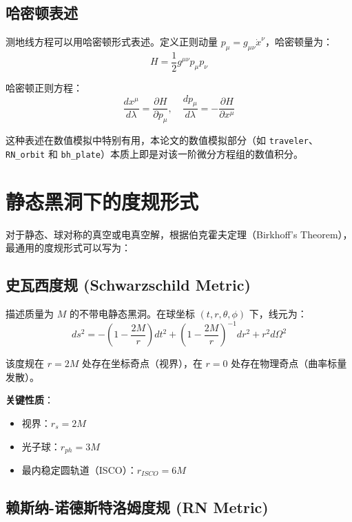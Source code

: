 \documentclass[a4paper,12pt]{article}
\begin{document}
\subsection{哈密顿表述}

测地线方程可以用哈密顿形式表述。定义正则动量 $p_\mu = g_{\mu\nu}\dot{x}^\nu$，哈密顿量为：
\begin{equation}
    H = \frac{1}{2}g^{\mu\nu}p_\mu p_\nu
\end{equation}

哈密顿正则方程：
\begin{equation}
    \frac{dx^\mu}{d\lambda} = \frac{\partial H}{\partial p_\mu}, \quad \frac{dp_\mu}{d\lambda} = -\frac{\partial H}{\partial x^\mu}
\end{equation}

这种表述在数值模拟中特别有用，本论文的数值模拟部分（如 \texttt{traveler}、\texttt{RN\_orbit} 和 \texttt{bh\_plate}）本质上即是对该一阶微分方程组的数值积分。

\section{静态黑洞下的度规形式}

对于静态、球对称的真空或电真空解，根据伯克霍夫定理（Birkhoff's Theorem），最通用的度规形式可以写为：

\subsection{史瓦西度规 (Schwarzschild Metric)}

描述质量为 $M$ 的不带电静态黑洞。在球坐标 $(t, r, \theta, \phi)$ 下，线元为：
\begin{equation}
    ds^2 = -\left(1-\frac{2M}{r}\right)dt^2 + \left(1-\frac{2M}{r}\right)^{-1}dr^2 + r^2 d\Omega^2
\end{equation}

该度规在 $r=2M$ 处存在坐标奇点（视界），在 $r=0$ 处存在物理奇点（曲率标量发散）。

\textbf{关键性质}：
\begin{itemize}
    \item 视界：$r_s = 2M$
    \item 光子球：$r_{ph} = 3M$
    \item 最内稳定圆轨道（ISCO）：$r_{ISCO} = 6M$
\end{itemize}

\subsection{赖斯纳-诺德斯特洛姆度规 (RN Metric)}
\end{document}
